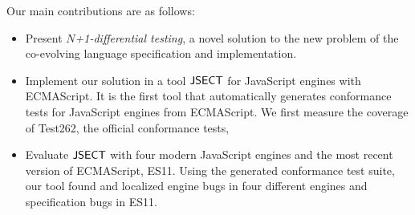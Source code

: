 Our main contributions are as follows:
\begin{itemize}
  \item Present \textit{$N$+1-differential testing}, a novel solution to the new
    problem of the co-evolving language specification and implementation.
  \item Implement our solution in a tool $\text{\sf JSECT}$ for JavaScript engines with
    ECMAScript.  It is the first tool that automatically generates conformance
    tests for JavaScript engines from ECMAScript.  We first measure the coverage
    of Test262, the official conformance tests, 
  \item Evaluate $\text{\sf JSECT}$ with four modern JavaScript engines and the most recent
    version of ECMAScript, ES11.  Using the generated conformance test
    suite, our tool found and localized  engine bugs in four different
    engines and  specification bugs in ES11.
\end{itemize}
